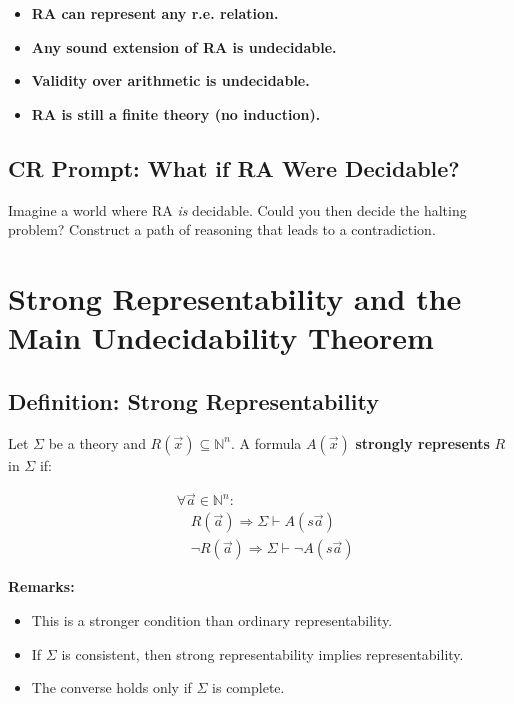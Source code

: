 \documentclass[12pt]{article}
\begin{document}
\begin{itemize}
  \item \textbf{RA can represent any r.e. relation.}
  \item \textbf{Any sound extension of RA is undecidable.}
  \item \textbf{Validity over arithmetic is undecidable.}
  \item \textbf{RA is still a finite theory (no induction).}
\end{itemize}

\subsection*{CR Prompt: What if RA Were Decidable?}

Imagine a world where RA \textit{is} decidable. Could you then decide the halting problem? Construct a path of reasoning that leads to a contradiction.

\section{Strong Representability and the Main Undecidability Theorem}

\subsection{Definition: Strong Representability}

Let \( \Sigma \) be a theory and \( R(\vec{x}) \subseteq \mathbb{N}^n \). A formula \( A(\vec{x}) \) \textbf{strongly represents} \( R \) in \( \Sigma \) if:

\begin{align*}
&\forall \vec{a} \in \mathbb{N}^n: \\
&\quad R(\vec{a}) \Rightarrow \Sigma \vdash A(s\vec{a}) \\
&\quad \neg R(\vec{a}) \Rightarrow \Sigma \vdash \neg A(s\vec{a})
\end{align*}

\textbf{Remarks:}

\begin{itemize}
  \item This is a stronger condition than ordinary representability.
  \item If \( \Sigma \) is consistent, then strong representability implies representability.
  \item The converse holds only if \( \Sigma \) is complete.
\end{itemize}
\end{document}
